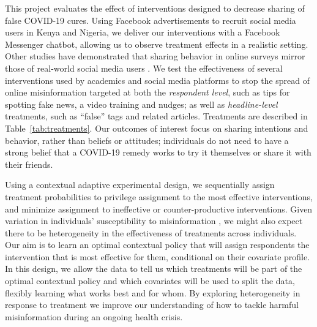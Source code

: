 \documentclass[letterpaper, 12pt, parskip=full,]{scrartcl}
\begin{document}
This project evaluates the effect of interventions designed to decrease sharing of false COVID-19 cures. Using Facebook advertisements to recruit social media users in Kenya and Nigeria, we deliver our interventions with a Facebook Messenger chatbot, allowing us to observe treatment effects in a realistic setting. Other studies have demonstrated that sharing behavior in online surveys mirror those of real-world social media users \citep{mosleh2020self}. We test the effectiveness of several interventions used by academics and social media platforms to stop the spread of online misinformation targeted at both the \textit{respondent level}, such as tips for spotting fake news, a video training and nudges; as well as \textit{headline-level} treatments, such as ``false'' tags and related articles. Treatments are described in Table~\ref{tab:treatments}. Our outcomes of interest focus on sharing intentions and behavior, rather than beliefs or attitudes; individuals do not need to have a strong belief that a COVID-19 remedy works to try it themselves or share it with their friends.


Using a contextual adaptive experimental design, we sequentially assign treatment probabilities to privilege assignment to the most effective interventions, and minimize assignment to ineffective or counter-productive interventions. Given variation in individuals' susceptibility to misinformation \citep{wittenberg2020misinformation}, we might also expect there to be heterogeneity in the effectiveness of treatments across individuals. Our aim is to learn an optimal contextual policy that will assign respondents the intervention that is most effective for them, conditional on their covariate profile. In this design, we allow the data to tell us which treatments will be part of the optimal contextual policy and which covariates will be used to split the data, flexibly learning what works best and for whom. By exploring heterogeneity in response to treatment we improve our understanding of how to tackle harmful misinformation during an ongoing health crisis. 
\end{document}
